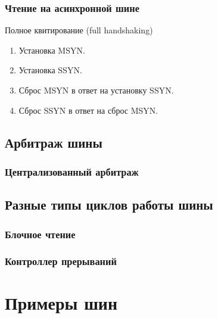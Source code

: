 \begin{frame}
\frametitle{Чтение на асинхронной шине}

\pause
\small\begin{block}{Полное квитирование (full handshaking)}
\vspace{-.2cm}
\begin{enumerate}
  \setlength{\itemsep}{3pt}
  \setlength{\parskip}{0pt}
  \setlength{\parsep}{0pt}
    \item Установка MSYN.
    \item Установка SSYN.
    \item Сброс MSYN в ответ на установку SSYN.
    \item Сброс SSYN в ответ на сброс MSYN.
\end{enumerate}
\end{block}
\end{frame}

\subsection{Арбитраж шины}

\begin{frame}
\frametitle{Централизованный арбитраж}
\pause
{}
\end{frame}

\subsection{Разные типы циклов работы шины}

\begin{frame}
\frametitle{Блочное чтение}
\end{frame}

\begin{frame}
\frametitle{Контроллер прерываний}
\end{frame}

\section{Примеры шин}

